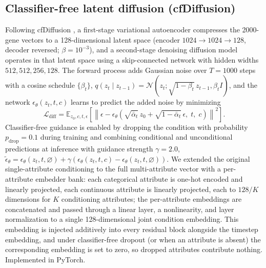 \documentclass[11pt]{article}
\begin{document}
\subsection{Classifier-free latent diffusion (cfDiffusion)}
Following cfDiffusion \cite{cfdiffusion}, a first-stage variational autoencoder compresses the 2000-gene vectors to a 128-dimensional latent space (encoder $1024\to1024\to128$, decoder reversed; $\beta=10^{-3}$), and a second-stage denoising diffusion model operates in that latent space using a skip-connected network with hidden widths $512,512,256,128$. The forward process adds Gaussian noise over $T=1000$ steps with a cosine schedule $\{\beta_t\}$, $q(z_t\mid z_{t-1})=\mathcal{N}(z_t;\sqrt{1-\beta_t}\,z_{t-1},\beta_t I)$, and the network $\epsilon_\theta(z_t,t,c)$ learns to predict the added noise by minimizing
\begin{equation}
\mathcal{L}_{\mathrm{diff}} = \mathbb{E}_{z_0,c,t,\epsilon}\left[\left\|\epsilon - \epsilon_\theta\!\left(\sqrt{\bar\alpha_t}\,z_0 + \sqrt{1-\bar\alpha_t}\,\epsilon,\; t,\; c\right)\right\|^2\right].
\end{equation}
Classifier-free guidance is enabled by dropping the condition with probability $p_{\mathrm{drop}}=0.1$ during training and combining conditional and unconditional predictions at inference with guidance strength $\gamma=2.0$, $\tilde\epsilon_\theta = \epsilon_\theta(z_t,t,\varnothing) + \gamma\left(\epsilon_\theta(z_t,t,c)-\epsilon_\theta(z_t,t,\varnothing)\right)$. We extended the original single-attribute conditioning to the full multi-attribute vector with a per-attribute embedder bank: each categorical attribute is one-hot encoded and linearly projected, each continuous attribute is linearly projected, each to $128/K$ dimensions for $K$ conditioning attributes; the per-attribute embeddings are concatenated and passed through a linear layer, a nonlinearity, and layer normalization to a single 128-dimensional joint condition embedding. This embedding is injected additively into every residual block alongside the timestep embedding, and under classifier-free dropout (or when an attribute is absent) the corresponding embedding is set to zero, so dropped attributes contribute nothing. Implemented in PyTorch.
\end{document}
